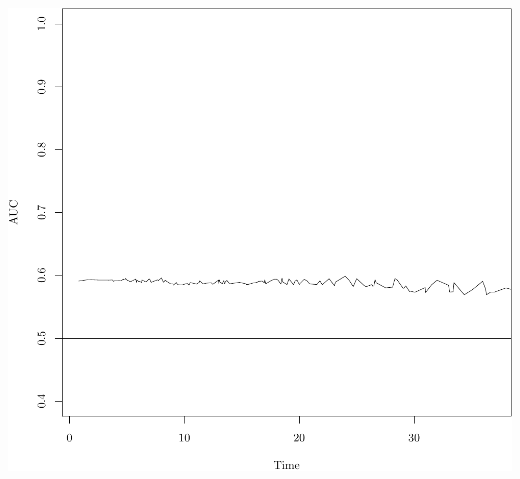 \documentclass{article}\usepackage[]{graphicx}\usepackage[]{color}
\makeatletter
\def\maxwidth{ %
  \ifdim\Gin@nat@width>\linewidth
    \linewidth
  \else
    \Gin@nat@width
  \fi
}
\newenvironment{knitrout}{}{} %
\makeatother
\begin{document}
\begin{knitrout}
{\centering \includegraphics[width=\maxwidth]{figure/05-risksetROC-12} 

}



\end{knitrout}
\end{document}

